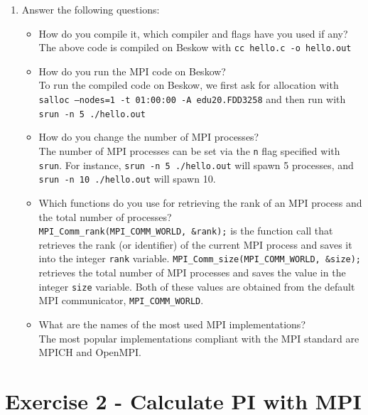 \documentclass[12pt]{article}
\begin{document}
\begin{enumerate}
	\item Answer the following questions:
	\begin{itemize}
	    \item How do you compile it, which compiler and flags have you used if any?\\
	    The above code is compiled on Beskow with \texttt{cc hello.c -o hello.out}
	    \item How do you run the MPI code on Beskow?\\
	    To run the compiled code on Beskow, we first ask for allocation with \texttt{salloc --nodes=1 -t 01:00:00 -A edu20.FDD3258} and then run with \texttt{srun -n 5 ./hello.out}
	    \item How do you change the number of MPI processes?\\
	    The number of MPI processes can be set via the \texttt{n} flag specified with \texttt{srun}. For instance, \texttt{srun -n 5 ./hello.out} will spawn 5 processes, and \texttt{srun -n 10 ./hello.out} will spawn 10.
	    \item Which functions do you use for retrieving the rank of an MPI process and the total number of processes?\\
	    \texttt{MPI\_Comm\_rank(MPI\_COMM\_WORLD, \&rank);} is the function call that retrieves the rank (or identifier) of the current MPI process and saves it into the integer \texttt{rank} variable. \texttt{MPI\_Comm\_size(MPI\_COMM\_WORLD, \&size);} retrieves the total number of MPI processes and saves the value in the integer \texttt{size} variable. Both of these values are obtained from the default MPI communicator, \texttt{MPI\_COMM\_WORLD}.
	    \item What are the names of the most used MPI implementations?\\
	    The most popular implementations compliant with the MPI standard are MPICH and OpenMPI.
	\end{itemize}
\end{enumerate}

\section{Exercise 2 - Calculate PI with MPI}
\end{document}
